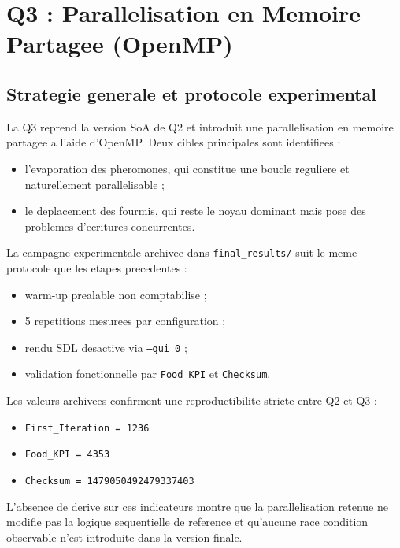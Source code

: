 \documentclass[11pt,a4paper]{article}
\begin{document}
\section{Q3 : Parallelisation en Memoire Partagee (OpenMP)}

\subsection{Strategie generale et protocole experimental}

La Q3 reprend la version SoA de Q2 et introduit une parallelisation en memoire partagee a l'aide d'OpenMP. Deux cibles principales sont identifiees :

\begin{itemize}[leftmargin=1.2em]
  \item l'evaporation des pheromones, qui constitue une boucle reguliere et naturellement parallelisable ;
  \item le deplacement des fourmis, qui reste le noyau dominant mais pose des problemes d'ecritures concurrentes.
\end{itemize}

La campagne experimentale archivee dans \texttt{final\_results/} suit le meme protocole que les etapes precedentes :

\begin{itemize}[leftmargin=1.2em]
  \item warm-up prealable non comptabilise ;
  \item 5 repetitions mesurees par configuration ;
  \item rendu SDL desactive via \texttt{--gui 0} ;
  \item validation fonctionnelle par \texttt{Food\_KPI} et \texttt{Checksum}.
\end{itemize}

Les valeurs archivees confirment une reproductibilite stricte entre Q2 et Q3 :

\begin{itemize}[leftmargin=1.2em]
  \item \texttt{First\_Iteration = 1236}
  \item \texttt{Food\_KPI = 4353}
  \item \texttt{Checksum = 1479050492479337403}
\end{itemize}

L'absence de derive sur ces indicateurs montre que la parallelisation retenue ne modifie pas la logique sequentielle de reference et qu'aucune race condition observable n'est introduite dans la version finale.
\end{document}
